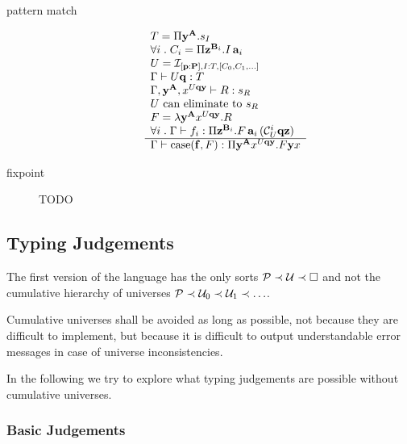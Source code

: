 \begin{definition}
\begin{description}
  \item[pattern match]
    $$
    \begin{array}{l} 
        T = \Pi \mathbf{y}^{\mathbf{A}}. s_I
        \\
        \forall i\;.\; C_i = \Pi \mathbf{z}^{\mathbf{B}_i}. I \, \mathbf{a}_i
        \\
        U =
            {\cal I }_{
                [\mathbf{p}:\mathbf{P}],
                I: T,
                [C_0, C_1, \ldots]}
        \\
        \Gamma \vdash U \mathbf{q}: T
        \\
        \Gamma, \mathbf{y}^{\mathbf{A}}, x^{U\mathbf{q}\mathbf{y}} \vdash R: s_R
        \\
        U \text{ can eliminate to } s_R
        \\
        F = \lambda \mathbf{y}^{\mathbf{A}} x^{U\mathbf{q}\mathbf{y}}. R
        \\
        \forall i\;.\;
            \Gamma
            \vdash
            f_i: \Pi \mathbf{z}^{\mathbf{B}_i}.
                F\,
                \mathbf{a}_i\,
                ({\cal C}^i_U \mathbf{q}\mathbf{z})
     \\ \hline 
        \Gamma
        \vdash
        \text{case}(\mathbf{f}, F)
        : \Pi \mathbf{y}^{\mathbf{A}} x^{U\mathbf{q}\mathbf{y}} . F \mathbf{y} x
    \end{array}
    $$

  \item[fixpoint]
    TODO

  \end{description}
\end{definition}




\subsection{Typing Judgements}
\label{sec:typing-judgements}

The first version of the language has the only sorts
${\cal{P}} \prec {\cal{U}} \prec \Box$ and not the cumulative hierarchy of universes
${\cal{P}} \prec {\cal{U}}_0 \prec {\cal{U}}_1 \prec \ldots$.

Cumulative universes shall be avoided as long as possible, not because they
are difficult to implement, but because it is difficult to output
understandable error messages in case of universe inconsistencies.

In the following we try to explore what typing judgements are possible without
cumulative universes.




\subsubsection{Basic Judgements}


